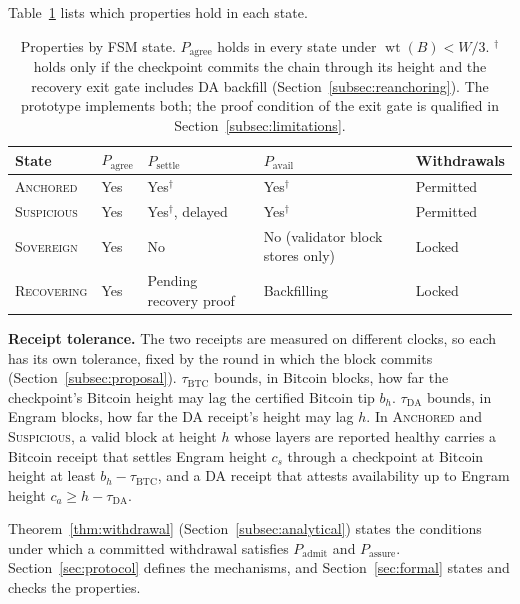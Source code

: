 Table~\ref{tab:mode-security} lists which properties hold in each state.

\begin{table}[tbp]
\caption{Properties by FSM state. $P_{\text{agree}}$ holds in every state
under $\operatorname{wt}(B) < W/3$. $^\dagger$ holds only if the checkpoint
commits the chain through its height and the recovery exit gate includes DA
backfill (Section~\ref{subsec:reanchoring}). The prototype implements both;
the proof condition of the exit gate is qualified in
Section~\ref{subsec:limitations}.}
\label{tab:mode-security}
\centering
\footnotesize
\begin{tabular}{@{}lllll@{}}
\toprule
\textbf{State} & $P_{\text{agree}}$ & $P_{\text{settle}}$ &
$P_{\text{avail}}$ & \textbf{Withdrawals} \\
\midrule
\textsc{Anchored} & Yes & Yes$^\dagger$ & Yes$^\dagger$ & Permitted \\
\textsc{Suspicious} & Yes & Yes$^\dagger$, delayed & Yes$^\dagger$ & Permitted \\
\textsc{Sovereign} & Yes & No & No (validator block stores only) & Locked \\
\textsc{Recovering} & Yes & Pending recovery proof & Backfilling & Locked \\
\bottomrule
\end{tabular}
\end{table}

\textbf{Receipt tolerance.} The two receipts are measured on different
clocks, so each has its own tolerance, fixed by the round in which the block
commits (Section~\ref{subsec:proposal}). $\tau_{\text{BTC}}$ bounds, in Bitcoin
blocks, how far the checkpoint's Bitcoin height may lag the certified Bitcoin
tip $b_h$. $\tau_{\text{DA}}$ bounds, in Engram blocks, how far the DA
receipt's height may lag $h$. In \textsc{Anchored} and \textsc{Suspicious}, a
valid block at height $h$ whose layers are reported healthy carries a Bitcoin
receipt that settles Engram height $c_s$ through a checkpoint at Bitcoin
height at least $b_h - \tau_{\text{BTC}}$, and a DA receipt that attests
availability up to Engram height $c_a \geq h - \tau_{\text{DA}}$.

Theorem~\ref{thm:withdrawal} (Section~\ref{subsec:analytical}) states the conditions under which
a committed withdrawal satisfies $P_{\text{admit}}$ and $P_{\text{assure}}$. Section~\ref{sec:protocol}
defines the mechanisms, and Section~\ref{sec:formal} states and checks the
properties.
